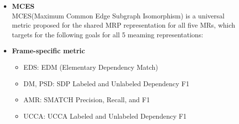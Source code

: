 \begin{itemize}
 \item \textbf{MCES} \\
MCES(Maximum Common Edge Subgraph Isomorphism) is a universal metric proposed for the shared MRP representation for all five MRs, which targets for the following goals for all 5 meaming representations:
\item \textbf{Frame-specific metric} \\
\begin{itemize}
\item EDS: EDM (Elementary Dependency Match)
\item DM, PSD: SDP Labeled and Unlabeled Dependency F1
\item AMR:  SMATCH Precision, Recall, and F1
\item UCCA: UCCA Labeled and Unlabeled Dependency F1
\end{itemize}
\end{itemize}




